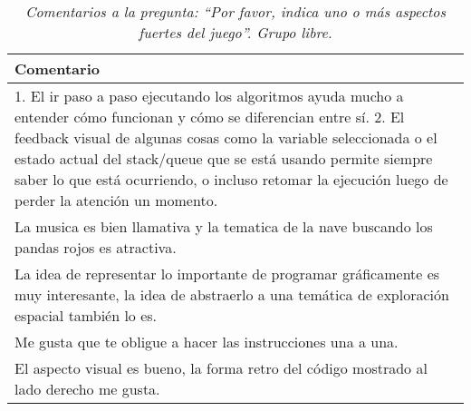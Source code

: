 
\begin{table}[h]
   \centering
   \caption*{\textit{Comentarios a la pregunta: ``Por favor, indica uno o más aspectos fuertes del juego''. Grupo libre.}}
   \begin{tabular}{|p{\linewidth}|}
   \hline %
   \textbf{Comentario} \\\hline
   1. El ir paso a paso ejecutando los algoritmos ayuda mucho a entender cómo funcionan y cómo se diferencian entre sí. 2. El feedback visual de algunas cosas como la variable seleccionada o el estado actual del stack/queue que se está usando permite siempre saber lo que está ocurriendo, o incluso retomar la ejecución luego de perder la atención un momento. \\\hline

   La musica es bien llamativa y la tematica de la nave buscando los pandas rojos es atractiva. \\\hline

   La idea de representar lo importante de programar gráficamente es muy interesante, la idea de abstraerlo a una temática de exploración espacial también lo es. \\\hline
   
   Me gusta que te obligue a hacer las instrucciones una a una. \\\hline

   El aspecto visual es bueno, la forma retro del código mostrado al lado derecho me gusta. \\

   \hline
   \end{tabular}
\end{table}

\restoregeometry



